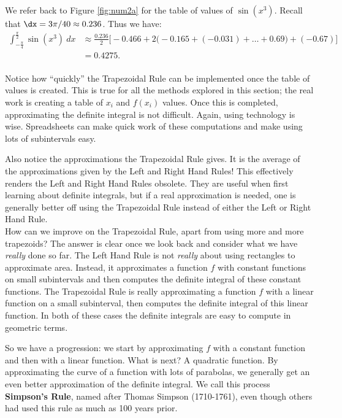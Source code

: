 {We refer back to Figure \ref{fig:num2a} for the table of values of $\sin(x^3)$. Recall that $\dx = 3\pi/40 \approx 0.236$. Thus we have:\small
\begin{align*}
\int_{-\frac{\pi}4}^{\frac{\pi}2} \sin (x^3)\ dx &\approx \frac{0.236}{2}\Big[-0.466 + 2\Big(-0.165+(-0.031)+\ldots+%
0.69\Big)+(-0.67)\Big]\\
			&= 0.4275.
\end{align*}
\normalsize
{}\baselineskip
}\\

Notice how ``quickly'' the Trapezoidal Rule can be implemented once the table of values is created. This is true for all the methods explored in this section; the real work is creating a table of $x_i$ and $f(x_i)$ values. Once this is completed, approximating the definite integral is not difficult. Again, using technology is wise. Spreadsheets can make quick work of these computations and make using lots of subintervals easy. 

Also notice the  approximations the Trapezoidal Rule gives. It is  the average of the approximations given by the Left and Right Hand Rules! This effectively renders the Left and Right Hand Rules obsolete. They are useful when first learning about definite integrals, but if a real approximation is needed, one is generally better off using the Trapezoidal Rule instead of either the Left or Right Hand Rule.\\

How can we improve on the Trapezoidal Rule, apart from using more and more trapezoids? The answer is clear once we look back and consider what we have \textit{really} done so far. The Left Hand Rule is not \textit{really} about using rectangles to approximate area. Instead, it approximates a function $f$ with constant functions on small subintervals and then computes the definite integral of these constant functions. The Trapezoidal Rule is really approximating a function $f$ with a linear function on a small subinterval, then computes the definite integral of this linear function. In both of these cases the definite integrals are easy to compute in geometric terms.

So we have a progression: we start by approximating $f$ with a constant function and then with a linear function. What is next? A quadratic function. By approximating the curve of a function with lots of parabolas, we generally get an even better approximation of the definite integral. We call this process \textbf{Simpson's Rule}, named after Thomas Simpson (1710-1761), even though others had used this rule as much as 100 years prior.\\

